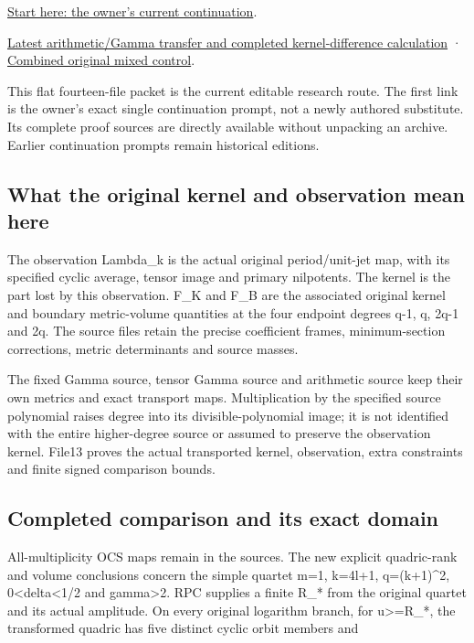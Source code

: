 \documentclass[
]{article}
\begin{document}
\href{workbenches/splitzero-tandem/continuations/20260914-original-kernel-web/00_CONTINUE_HERE.md}{Start
here: the owner's current continuation}.

\href{workbenches/splitzero-tandem/continuations/20260914-original-kernel-web/13_ARITHMETIC_MIXED_TRANSFER.tex}{Latest
arithmetic/Gamma transfer and completed kernel-difference calculation} ·
\href{workbenches/splitzero-tandem/continuations/20260914-original-kernel-web/08_ORIGINAL_MIXED_CONTROL.tex}{Combined
original mixed control}.

This flat fourteen-file packet is the current editable research route.
The first link is the owner's exact single continuation prompt, not a
newly authored substitute. Its complete proof sources are directly
available without unpacking an archive. Earlier continuation prompts
remain historical editions.

\subsection{What the original kernel and observation mean
here}\label{what-the-original-kernel-and-observation-mean-here}

The observation Lambda\_k is the actual original period/unit-jet map,
with its specified cyclic average, tensor image and primary nilpotents.
The kernel is the part lost by this observation. F\_K and F\_B are the
associated original kernel and boundary metric-volume quantities at the
four endpoint degrees q-1, q, 2q-1 and 2q. The source files retain the
precise coefficient frames, minimum-section corrections, metric
determinants and source masses.

The fixed Gamma source, tensor Gamma source and arithmetic source keep
their own metrics and exact transport maps. Multiplication by the
specified source polynomial raises degree into its divisible-polynomial
image; it is not identified with the entire higher-degree source or
assumed to preserve the observation kernel. File13 proves the actual
transported kernel, observation, extra constraints and finite signed
comparison bounds.

\subsection{Completed comparison and its exact
domain}\label{completed-comparison-and-its-exact-domain}

All-multiplicity OCS maps remain in the sources. The new explicit
quadric-rank and volume conclusions concern the simple quartet m=1,
k=4l+1, q=(k+1)\^{}2, 0\textless delta\textless1/2 and
gamma\textgreater2. RPC supplies a finite R\_* from the original quartet
and its actual amplitude. On every original logarithm branch, for
\textbar u\textbar\textgreater=R\_*, the transformed quadric has five
distinct cyclic orbit members and
\end{document}

